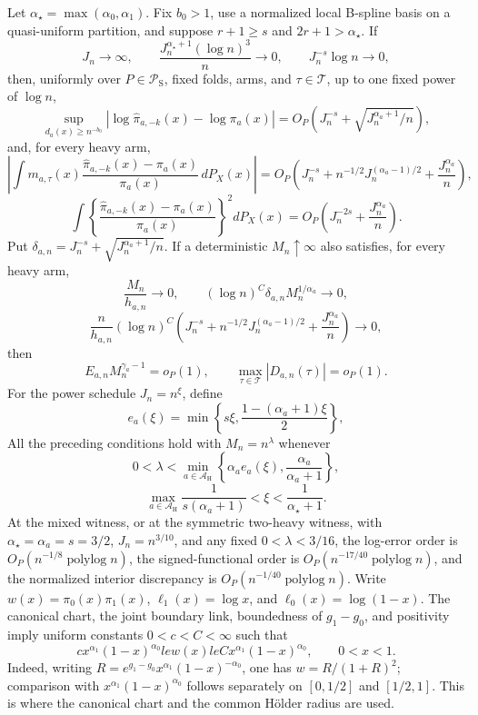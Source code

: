 Let \(\alpha_\star=\max(\alpha_0,\alpha_1)\).  Fix \(b_0>1\), use a normalized local B-spline basis on a quasi-uniform partition, and suppose \(r+1\ge s\) and \(2r+1>\alpha_\star\).  If
\[
 J_n\to\infty,\qquad
 \frac{J_n^{\alpha_\star+1}(\log n)^3}{n}\to0,
 \qquad J_n^{-s}\log n\to0,
\]
then, uniformly over \(P\in\mathcal P_{\mathrm S}\), fixed folds, arms, and \(\tau\in\mathcal T\), up to one fixed power of \(\log n\),
\[
 \sup_{d_a(x)\ge n^{-b_0}}
 |\log\widehat\pi_{a,-k}(x)-\log\pi_a(x)|
 =O_P\!\left(J_n^{-s}+\sqrt{J_n^{\alpha_a+1}/n}\right),
\]
and, for every heavy arm,
\[
 \left|\int m_{a,\tau}(x)
 \frac{\widehat\pi_{a,-k}(x)-\pi_a(x)}{\pi_a(x)}\,dP_X(x)\right|
 =O_P\!\left(J_n^{-s}+n^{-1/2}J_n^{(\alpha_a-1)/2}+\frac{J_n^{\alpha_a}}n\right),
\]
\[
 \int\left\{\frac{\widehat\pi_{a,-k}(x)-\pi_a(x)}{\pi_a(x)}\right\}^2dP_X(x)
 =O_P\!\left(J_n^{-2s}+\frac{J_n^{\alpha_a}}n\right).
\]
Put \(\delta_{a,n}=J_n^{-s}+\sqrt{J_n^{\alpha_a+1}/n}\).  If a deterministic \(M_n\uparrow\infty\) also satisfies, for every heavy arm,
\[
 \frac{M_n}{h_{a,n}}\to0,
 \qquad
 (\log n)^C\delta_{a,n}M_n^{1/\alpha_a}\to0,
\]
\[
 \frac n{h_{a,n}}(\log n)^C
 \left(J_n^{-s}+n^{-1/2}J_n^{(\alpha_a-1)/2}+\frac{J_n^{\alpha_a}}n\right)\to0,
\]
then
\[
 E_{a,n}M_n^{\gamma_a-1}=o_P(1),
 \qquad
 \max_{\tau\in\mathcal T}|D_{a,n}(\tau)|=o_P(1).
\]
For the power schedule \(J_n=n^\xi\), define
\[
 e_a(\xi)=\min\left\{s\xi,\frac{1-(\alpha_a+1)\xi}{2}\right\},
\]
All the preceding conditions hold with \(M_n=n^\lambda\) whenever
\[
 0<\lambda<
 \min_{a\in\mathcal A_{\mathrm H}}
 \left\{\alpha_ae_a(\xi),\frac{\alpha_a}{\alpha_a+1}\right\},
\]
\[
 \max_{a\in\mathcal A_{\mathrm H}}\frac1{s(\alpha_a+1)}<\xi<\frac1{\alpha_\star+1}.
\]
At the mixed witness, or at the symmetric two-heavy witness, with \(\alpha_\star=\alpha_a=s=3/2\), \(J_n=n^{3/10}\), and any fixed \(0<\lambda<3/16\), the log-error order is \(O_P(n^{-1/8}\operatorname{polylog}n)\), the signed-functional order is \(O_P(n^{-17/40}\operatorname{polylog}n)\), and the normalized interior discrepancy is \(O_P(n^{-1/40}\operatorname{polylog}n)\).
Write \(w(x)=\pi_0(x)\pi_1(x)\), \(\ell_1(x)=\log x\), and \(\ell_0(x)=\log(1-x)\).  The canonical chart, the joint boundary link, boundedness of \(g_1-g_0\), and positivity imply uniform constants \(0<c<C<\infty\) such that
\[
 c x^{\alpha_1}(1-x)^{\alpha_0}le w(x)le
 C x^{\alpha_1}(1-x)^{\alpha_0},\qquad 0<x<1.
\tag{B1}
\]
Indeed, writing \(R=e^{g_1-g_0}x^{\alpha_1}(1-x)^{-\alpha_0}\), one has \(w=R/(1+R)^2\); comparison with \(x^{\alpha_1}(1-x)^{\alpha_0}\) follows separately on \([0,1/2]\) and \([1/2,1]\).  This is where the canonical chart and the common Hölder radius are used.

